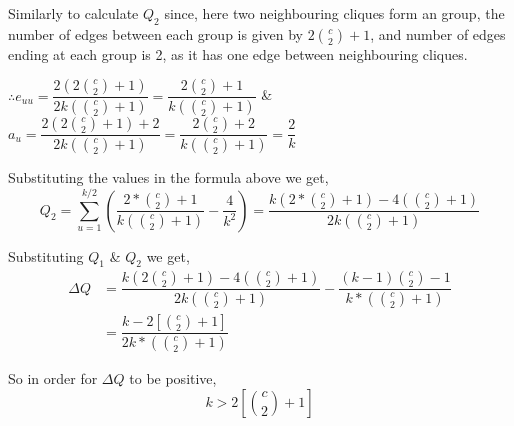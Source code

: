 \documentclass{article}
\begin{document}
\begin{enumerate}[label=(\alph*)]
Similarly to calculate $Q_2$ since, here two neighbouring cliques form an group, the number of edges between each group is given by $2{c \choose 2} + 1$, and number of edges ending at each group is 2, as it has one edge between neighbouring cliques. 

$\therefore e_{uu} = \dfrac{2 (2 {c \choose 2} +1)}{2k({c \choose 2} +1)} = \dfrac{2{c \choose 2} +1}{k({c \choose 2} +1)}$ \& $a_u = \dfrac{2 (2 {c \choose 2} +1) + 2}{2k({c \choose 2} +1)} = \dfrac{2{c \choose 2} +2}{k({c \choose 2}+1)} = \dfrac{2}{k}$

Substituting the values in the formula above we get,
$$Q_2 = \sum_{u=1}^{k/2} (\dfrac{2*{c \choose 2} + 1}{k({c \choose 2} +1)} -  \dfrac{4}{k^2})= \dfrac{k(2*{c \choose 2} + 1) - 4({c \choose 2} +1)}{2k({c \choose 2} +1)}$$

Substituting $Q_1$ \& $Q_2$ we get,
\begin{align*}
\Delta Q &= \dfrac{k(2{c \choose 2} + 1) - 4({c \choose 2} +1)}{2k({c \choose 2} +1)} - \dfrac{(k-1){c \choose 2} - 1}{k*({c \choose 2} +1)}\\
&= \dfrac{k - 2[{c \choose 2} + 1]}{2k*({c \choose 2} +1)}
\end{align*}

So in order for $\Delta Q$ to be positive,
$$k > 2[{c \choose 2} + 1]$$
\end{enumerate}
\newpage
\end{document}
